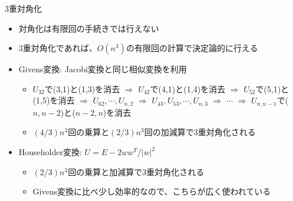 \begin{frame}[t,fragile]{3重対角化}
  \begin{itemize}
  \item 対角化は有限回の手続きでは行えない
  \item 3重対角化であれば、$O(n^3)$の有限回の計算で決定論的に行える
  \item Givens変換: Jacobi変換と同じ相似変換を利用
    \begin{itemize}
    \item $U_{32}$で(3,1)と(1,3)を消去 $\Rightarrow$ $U_{42}$で(4,1)と(1,4)を消去 $\Rightarrow$ $U_{52}$で(5,1)と(1,5)を消去 $\Rightarrow$ $U_{62},\cdots,U_{n,2}$ $\Rightarrow$ $U_{43},U_{53},\cdots,U_{n,3}$ $\Rightarrow$ $\cdots$ $\Rightarrow$ $U_{n,n-1}$で($n,n-2$)と($n-2,n$)を消去
    \item $(4/3)n^3$回の乗算と$(2/3)n^3$回の加減算で3重対角化される
    \end{itemize}
  \item Householder変換: $U = E - 2 w w^T / |w|^2$
    \begin{itemize}
    \item $(2/3)n^3$回の乗算と加減算で3重対角化される
    \item Givens変換に比べ少し効率的なので、こちらが広く使われている
    \end{itemize}
  \end{itemize}
\end{frame}
